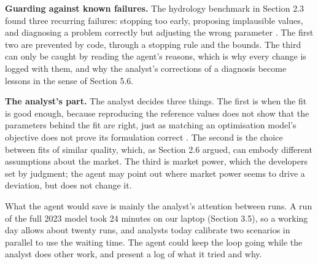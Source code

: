 \textbf{Guarding against known failures.} The hydrology benchmark in Section 2.3 found three recurring failures: stopping too early, proposing implausible values, and diagnosing a problem correctly but adjusting the wrong parameter \citep{li2026hydroagent}.
The first two are prevented by code, through a stopping rule and the bounds.
The third can only be caught by reading the agent's reasons, which is why every change is logged with them, and why the analyst's corrections of a diagnosis become lessons in the sense of Section 5.6.

\textbf{The analyst's part.} The analyst decides three things.
The first is when the fit is good enough, because reproducing the reference values does not show that the parameters behind the fit are right, just as matching an optimisation model's objective does not prove its formulation correct \citep{li2026optargus}.
The second is the choice between fits of similar quality, which, as Section 2.6 argued, can embody different assumptions about the market.
The third is market power, which the developers set by judgment; the agent may point out where market power seems to drive a deviation, but does not change it.

What the agent would save is mainly the analyst's attention between runs.
A run of the full 2023 model took 24 minutes on our laptop (Section 3.5), so a working day allows about twenty runs, and analysts today calibrate two scenarios in parallel to use the waiting time.
The agent could keep the loop going while the analyst does other work, and present a log of what it tried and why.
